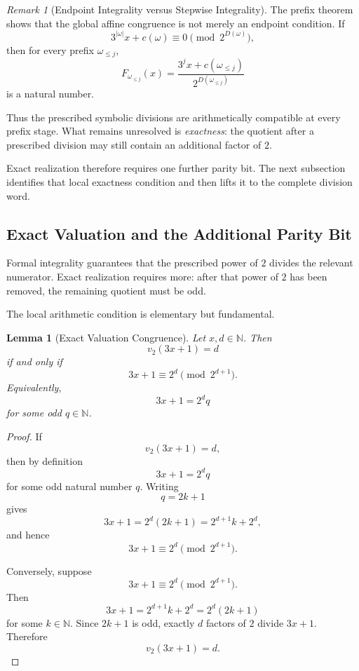 \documentclass[12pt, oneside]{article}
\numberwithin{equation}{section}
\theoremstyle{definition}
\theoremstyle{plain}
\newtheorem{lemma}[theorem]{Lemma}
\theoremstyle{remark}
\newtheorem*{remark}{Remark}
\begin{document}
\begin{remark}[Endpoint Integrality versus Stepwise Integrality]
The prefix theorem shows that the global affine congruence is not merely an
endpoint condition. If
\[
3^{|\omega|}x+c(\omega)
\equiv
0
\pmod{2^{D(\omega)}},
\]
then for every prefix \(\omega_{\le j}\),
\[
F_{\omega_{\le j}}(x)
=
\frac{
3^j x+c(\omega_{\le j})
}{
2^{D(\omega_{\le j})}
}
\]
is a natural number.

Thus the prescribed symbolic divisions are arithmetically compatible at
every prefix stage. What remains unresolved is \emph{exactness}: the
quotient after a prescribed division may still contain an additional
factor of \(2\).

Exact realization therefore requires one further parity bit. The next
subsection identifies that local exactness condition and then lifts it to
the complete division word.
\end{remark}

\subsection{Exact Valuation and the Additional Parity Bit}

Formal integrality guarantees that the prescribed power of \(2\) divides
the relevant numerator. Exact realization requires more: after that power
of \(2\) has been removed, the remaining quotient must be odd.

The local arithmetic condition is elementary but fundamental.

\begin{lemma}[Exact Valuation Congruence]
\label{lem:exact-valuation-congruence}
Let \(x,d\in\mathbb N\). Then
\[
v_2(3x+1)=d
\]
if and only if
\[
3x+1
\equiv
2^d
\pmod{2^{d+1}}.
\]
Equivalently,
\[
3x+1=2^d q
\]
for some odd \(q\in\mathbb N\).
\end{lemma}

\begin{proof}
If
\[
v_2(3x+1)=d,
\]
then by definition
\[
3x+1=2^d q
\]
for some odd natural number \(q\). Writing
\[
q=2k+1
\]
gives
\[
3x+1
=
2^d(2k+1)
=
2^{d+1}k+2^d,
\]
and hence
\[
3x+1
\equiv
2^d
\pmod{2^{d+1}}.
\]

Conversely, suppose
\[
3x+1
\equiv
2^d
\pmod{2^{d+1}}.
\]
Then
\[
3x+1
=
2^{d+1}k+2^d
=
2^d(2k+1)
\]
for some \(k\in\mathbb N\). Since \(2k+1\) is odd, exactly \(d\) factors
of \(2\) divide \(3x+1\). Therefore
\[
v_2(3x+1)=d.
\]
\end{proof}
\end{document}

